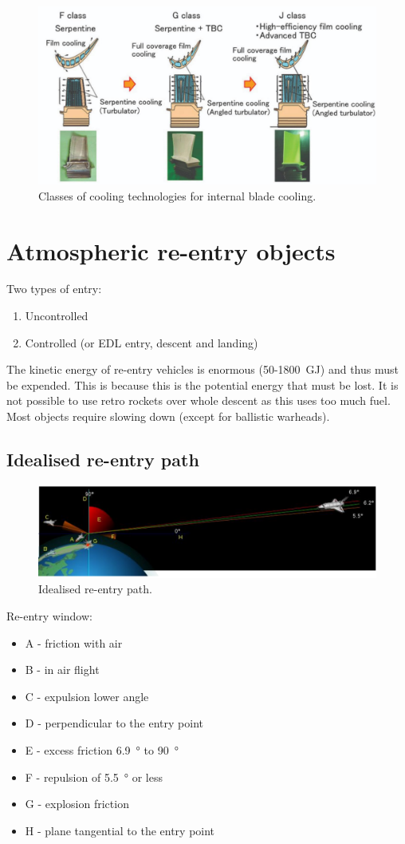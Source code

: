 \begin{figure}[H]
    \centering
    \includegraphics[width =\textwidth]{img/figure35.png}
    \caption{Classes of cooling technologies for internal blade cooling.}
\end{figure}
\section{Atmospheric re-entry objects}
Two types of entry:
\begin{enumerate}
    \item Uncontrolled
    \item Controlled (or EDL entry, descent and landing)
\end{enumerate}
The kinetic energy of re-entry vehicles is enormous (50-\SI{1800}{\giga\joule}) and thus must be expended. This is because this is the potential energy that must be lost. It is not possible to use retro rockets over whole descent as this uses too much fuel. Most objects require slowing down (except for ballistic warheads).
\subsection{Idealised re-entry path}
\begin{figure}[H]
    \centering
    \includegraphics[width =\textwidth]{img/figure36.png}
    \caption{Idealised re-entry path.}
\end{figure}
Re-entry window:
\begin{itemize}
    \item A - friction with air
    \item B - in air flight
    \item C - expulsion lower angle
    \item D - perpendicular to the entry point
    \item E - excess friction \SI{6.9}{\degree} to \SI{90}{\degree}
    \item F - repulsion of \SI{5.5}{\degree} or less
    \item G - explosion friction
    \item H - plane tangential to the entry point
\end{itemize}
